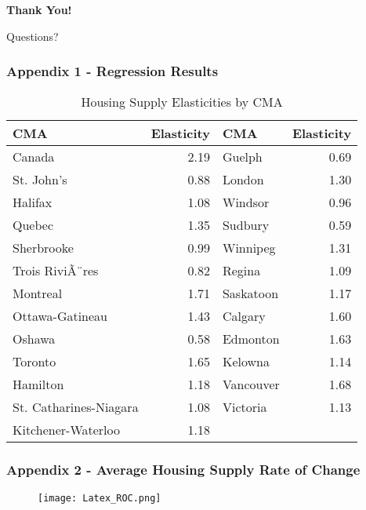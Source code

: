 \documentclass{beamer}
\begin{document}
\begin{frame}

\centering
    \vspace{1.5cm}
    
    {\LARGE \textbf{Thank You!}} \\
    \vspace{0.6cm}
    
    {\Large Questions?} \\
    \vspace{1cm}
\end{frame}




\begin{frame}
\frametitle{Appendix 1 - Regression Results}
\begin{table}[ht]
\centering
\begin{tabular}{l r l r}
  \hline
  CMA & Elasticity & CMA & Elasticity \\ 
  \hline
  Canada & 2.19 & Guelph & 0.69 \\ 
  St. John's & 0.88 & London & 1.30 \\ 
  Halifax & 1.08 & Windsor & 0.96 \\ 
  Quebec & 1.35 & Sudbury & 0.59 \\ 
  Sherbrooke & 0.99 & Winnipeg & 1.31 \\ 
  Trois RiviÃ¨res & 0.82 & Regina & 1.09 \\ 
  Montreal & 1.71 & Saskatoon & 1.17 \\ 
  Ottawa-Gatineau & 1.43 & Calgary & 1.60 \\ 
  Oshawa & 0.58 & Edmonton & 1.63 \\ 
  Toronto & 1.65 & Kelowna & 1.14 \\ 
  Hamilton & 1.18 & Vancouver & 1.68 \\ 
  St. Catharines-Niagara & 1.08 & Victoria & 1.13 \\ 
  Kitchener-Waterloo & 1.18 & & \\ 
  \hline
\end{tabular}
\caption{Housing Supply Elasticities by CMA} 
\label{tab:elasticity}
\end{table}

\end{frame}

\begin{frame}
\frametitle{Appendix 2 - Average Housing Supply Rate of Change}
\begin{figure}
    \centering
    \texttt{[image: Latex\_ROC.png]}
    \label{fig:enter-label}
\end{figure}
\end{frame}
\end{document}
